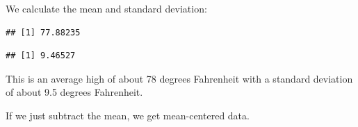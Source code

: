 \documentclass[
]{book}
\newenvironment{Shaded}{\begin{snugshade}}{\end{snugshade}}
\newcommand{\FunctionTok}[1]{\textcolor[rgb]{0.00,0.00,0.00}{#1}}
\newcommand{\NormalTok}[1]{#1}
\newcommand{\SpecialCharTok}[1]{\textcolor[rgb]{0.00,0.00,0.00}{#1}}
\begin{document}
We calculate the mean and standard deviation:

\begin{Shaded}
\end{Shaded}

\begin{verbatim}
## [1] 77.88235
\end{verbatim}

\begin{Shaded}
\end{Shaded}

\begin{verbatim}
## [1] 9.46527
\end{verbatim}

This is an average high of about 78 degrees Fahrenheit with a standard deviation of about 9.5 degrees Fahrenheit.

If we just subtract the mean, we get mean-centered data.

\begin{Shaded}
\end{Shaded}
\end{document}
